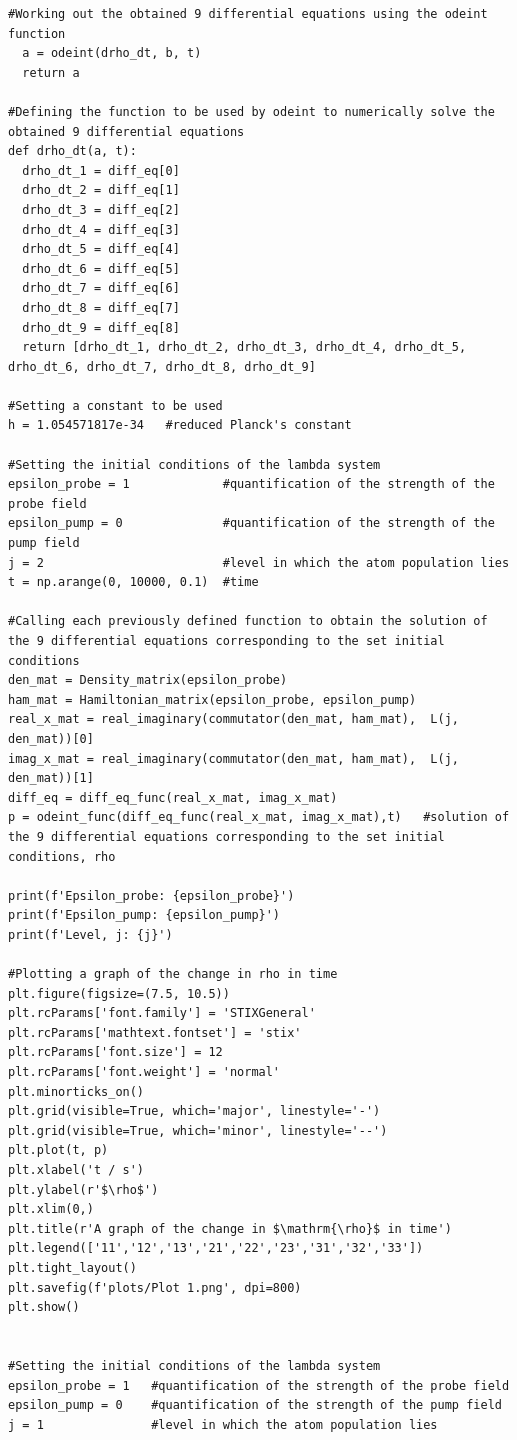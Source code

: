 \documentclass[12pt, a4paper]{article}
\begin{document}
\begin{lstlisting}[language=iPython]
  #Working out the obtained 9 differential equations using the odeint function
  a = odeint(drho_dt, b, t)
  return a

#Defining the function to be used by odeint to numerically solve the obtained 9 differential equations
def drho_dt(a, t):
  drho_dt_1 = diff_eq[0]
  drho_dt_2 = diff_eq[1]
  drho_dt_3 = diff_eq[2]
  drho_dt_4 = diff_eq[3]
  drho_dt_5 = diff_eq[4]
  drho_dt_6 = diff_eq[5]
  drho_dt_7 = diff_eq[6]
  drho_dt_8 = diff_eq[7]
  drho_dt_9 = diff_eq[8]
  return [drho_dt_1, drho_dt_2, drho_dt_3, drho_dt_4, drho_dt_5, drho_dt_6, drho_dt_7, drho_dt_8, drho_dt_9]

#Setting a constant to be used
h = 1.054571817e-34   #reduced Planck's constant

#Setting the initial conditions of the lambda system
epsilon_probe = 1             #quantification of the strength of the probe field
epsilon_pump = 0              #quantification of the strength of the pump field
j = 2                         #level in which the atom population lies
t = np.arange(0, 10000, 0.1)  #time

#Calling each previously defined function to obtain the solution of the 9 differential equations corresponding to the set initial conditions
den_mat = Density_matrix(epsilon_probe)
ham_mat = Hamiltonian_matrix(epsilon_probe, epsilon_pump)
real_x_mat = real_imaginary(commutator(den_mat, ham_mat),  L(j, den_mat))[0]
imag_x_mat = real_imaginary(commutator(den_mat, ham_mat),  L(j, den_mat))[1]
diff_eq = diff_eq_func(real_x_mat, imag_x_mat)
p = odeint_func(diff_eq_func(real_x_mat, imag_x_mat),t)   #solution of the 9 differential equations corresponding to the set initial conditions, rho

print(f'Epsilon_probe: {epsilon_probe}')
print(f'Epsilon_pump: {epsilon_pump}')
print(f'Level, j: {j}')

#Plotting a graph of the change in rho in time
plt.figure(figsize=(7.5, 10.5))
plt.rcParams['font.family'] = 'STIXGeneral'
plt.rcParams['mathtext.fontset'] = 'stix'
plt.rcParams['font.size'] = 12
plt.rcParams['font.weight'] = 'normal'
plt.minorticks_on()
plt.grid(visible=True, which='major', linestyle='-')
plt.grid(visible=True, which='minor', linestyle='--')
plt.plot(t, p)
plt.xlabel('t / s')
plt.ylabel(r'$\rho$')
plt.xlim(0,)
plt.title(r'A graph of the change in $\mathrm{\rho}$ in time')
plt.legend(['11','12','13','21','22','23','31','32','33'])
plt.tight_layout()
plt.savefig(f'plots/Plot 1.png', dpi=800)
plt.show()


#Setting the initial conditions of the lambda system
epsilon_probe = 1   #quantification of the strength of the probe field
epsilon_pump = 0    #quantification of the strength of the pump field
j = 1               #level in which the atom population lies


\end{lstlisting}
\end{document}
